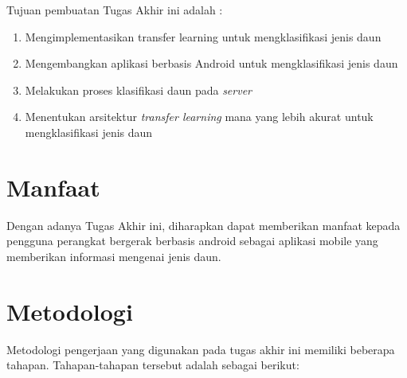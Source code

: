 Tujuan pembuatan Tugas Akhir ini adalah :
\begin {enumerate}
\item Mengimplementasikan transfer learning untuk mengklasifikasi jenis daun
\item Mengembangkan aplikasi berbasis Android untuk mengklasifikasi jenis daun
\item Melakukan proses klasifikasi daun pada \textit{server}
\item Menentukan arsitektur \textit{transfer learning} mana yang lebih akurat untuk mengklasifikasi jenis daun
\end{enumerate}

\section{Manfaat}
Dengan adanya Tugas Akhir ini, diharapkan dapat memberikan manfaat kepada pengguna perangkat bergerak berbasis android sebagai aplikasi mobile yang memberikan informasi mengenai jenis daun. 

\section {Metodologi}

Metodologi pengerjaan yang digunakan pada tugas akhir ini memiliki beberapa tahapan. Tahapan-tahapan tersebut adalah sebagai berikut:

